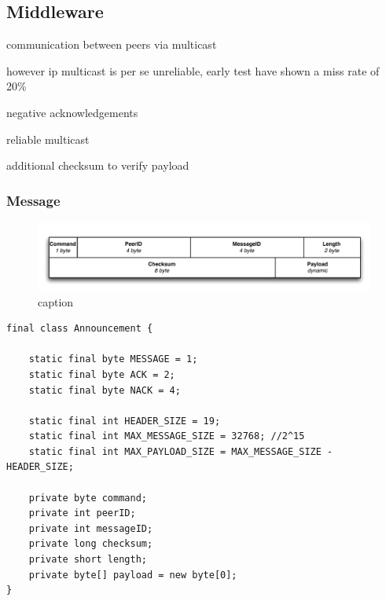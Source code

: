 


\subsection{Middleware}
communication between peers via multicast 

however ip multicast is per se unreliable, early test have shown a miss rate of 20\%

negative acknowledgements

reliable multicast

additional checksum to verify payload

\subsubsection{Message}


\begin{figure}[htbp]
    \centering
        \includegraphics[width=.9\textwidth]{figures/message.pdf}
    \caption{caption}
    \label{fig:figures_announcement}
\end{figure}


\begin{lstlisting}
final class Announcement {

	static final byte MESSAGE = 1;
	static final byte ACK = 2;
	static final byte NACK = 4;

	static final int HEADER_SIZE = 19;
	static final int MAX_MESSAGE_SIZE = 32768; //2^15
	static final int MAX_PAYLOAD_SIZE = MAX_MESSAGE_SIZE - HEADER_SIZE;

	private byte command;
	private int peerID;
	private int messageID;
	private long checksum;
	private short length;
	private byte[] payload = new byte[0];
}
\end{lstlisting}



